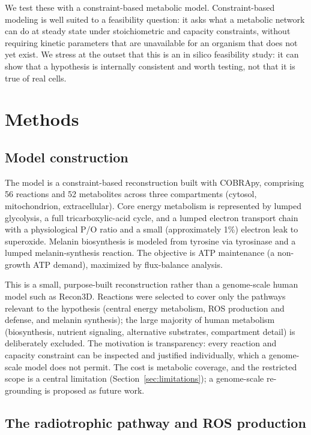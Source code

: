 \documentclass[11pt]{article}
\begin{document}
We test these with a constraint-based metabolic model. Constraint-based modeling
is well suited to a feasibility question: it asks what a metabolic network can do
at steady state under stoichiometric and capacity constraints, without requiring
kinetic parameters that are unavailable for an organism that does not yet exist.
We stress at the outset that this is an in silico feasibility study: it can show
that a hypothesis is internally consistent and worth testing, not that it is true
of real cells.

\section{Methods}

\subsection{Model construction}

The model is a constraint-based reconstruction built with COBRApy, comprising 56
reactions and 52 metabolites across three compartments (cytosol, mitochondrion,
extracellular). Core energy metabolism is represented by lumped glycolysis, a full
tricarboxylic-acid cycle, and a lumped electron transport chain with a
physiological P/O ratio and a small (approximately 1\%) electron leak to
superoxide. Melanin biosynthesis is modeled from tyrosine via tyrosinase and a
lumped melanin-synthesis reaction. The objective is ATP maintenance (a non-growth
ATP demand), maximized by flux-balance analysis.

This is a small, purpose-built reconstruction rather than a genome-scale human
model such as Recon3D. Reactions were selected to cover only the pathways relevant
to the hypothesis (central energy metabolism, ROS production and defense, and
melanin synthesis); the large majority of human metabolism (biosynthesis, nutrient
signaling, alternative substrates, compartment detail) is deliberately excluded.
The motivation is transparency: every reaction and capacity constraint can be
inspected and justified individually, which a genome-scale model does not permit.
The cost is metabolic coverage, and the restricted scope is a central limitation
(Section~\ref{sec:limitations}); a genome-scale re-grounding is proposed as future
work.

\subsection{The radiotrophic pathway and ROS production}
\end{document}
